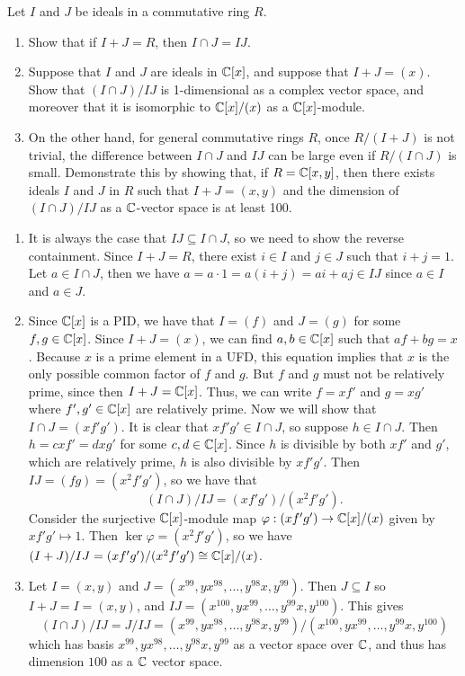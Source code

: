 %
\begin{question}[subtitle=August 2013 Problem ?,ID=Aug13_?]
Let $I$ and $J$ be ideals in a commutative ring $R$.
\begin{enumerate}
    \item Show that if $I + J = R$, then $I \cap J = IJ$.
    \item Suppose that $I$ and $J$ are ideals in $\mathbb{C}[x]$, and suppose that $I + J = (x)$. Show that $(I \cap J)/IJ$ is 1-dimensional as a complex vector space, and moreover that it is isomorphic to $\mathbb{C}[x]/(x)$ as a $\mathbb{C}[x]$-module.
    \item On the other hand, for general commutative rings $R$, once $R/(I+J)$ is not trivial, the difference between $I \cap J$ and $IJ$ can be large even if $R/(I \cap J)$ is small. Demonstrate this by showing that, if $R = \mathbb{C}[x,y]$, then there exists ideals $I$ and $J$ in $R$ such that $I + J = (x, y)$ and the dimension of $(I \cap J)/IJ$ as a $\mathbb{C}$-vector space is at least 100.
\end{enumerate}
\end{question}
\begin{solution}
\begin{enumerate}
    \item It is always the case that $IJ \subseteq I \cap J$, so we need to show the reverse containment. Since $I+J = R$, there exist $i \in I$ and $j \in J$ such that $i+j=1$. Let $a \in I \cap J$, then we have $a = a\cdot 1 = a(i+j) = ai+aj \in IJ$ since $a \in I$ and $a \in J$.
    \item Since $\mathbb{C}[x]$ is a PID, we have that $I=(f)$ and $J=(g)$ for some $f,g \in \mathbb{C}[x]$. Since $I+J = (x)$, we can find $a,b \in \mathbb{C}[x]$ such that $af+bg = x$. Because $x$ is a prime element in a UFD, this equation implies that $x$ is the only possible common factor of $f$ and $g$. But $f$ and $g$ must not be relatively prime, since then $I+J=\mathbb{C}[x]$. Thus, we can write $f= xf'$ and $g=xg'$ where $f',g' \in \mathbb{C}[x]$ are relatively prime. Now we will show that $I\cap J = (xf'g')$. It is clear that $xf'g' \in I \cap J$, so suppose $h \in I \cap J$. Then $h=cxf'=dxg'$ for some $c,d \in \mathbb{C}[x]$. Since $h$ is divisible by both $xf'$ and $g'$, which are relatively prime, $h$ is also divisible by $xf'g'$. Then $IJ = (fg) = (x^2f'g')$, so we have that
    \[(I \cap J)/IJ = (xf'g')/(x^2f'g').\]
    Consider the surjective $\mathbb{C}[x]$-module map $\varphi: (xf'g') \to \mathbb{C}[x]/(x)$ given by $xf'g' \mapsto 1$. Then $\ker \varphi = (x^2f'g')$, so we have $(I+J)/IJ = (xf'g')/(x^2f'g') \cong \mathbb{C}[x]/(x)$.
    \item Let $I=(x,y)$ and $J= (x^{99},yx^{98},\dots, y^{98}x,y^{99})$. Then $J \subseteq I$ so $I+J=I = (x,y)$, and $IJ = (x^{100},yx^{99},\dots,y^{99}x,y^{100})$. This gives
    \[(I\cap J)/IJ = J/IJ = (x^{99},yx^{98},\dots, y^{98}x,y^{99})/(x^{100},yx^{99},\dots,y^{99}x,y^{100})\]
    which has basis $x^{99},yx^{98},\dots, y^{98}x,y^{99}$ as a vector space over $\mathbb{C}$, and thus has dimension $100$ as a $\mathbb{C}$ vector space.
\end{enumerate}
\end{solution}

